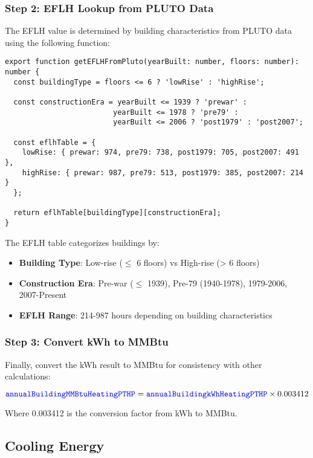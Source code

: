 \documentclass{article}
\newcommand{\code}[1]{\textcolor{blue}{\texttt{#1}}}
\begin{document}
\subsubsection{Step 2: EFLH Lookup from PLUTO Data}

The EFLH value is determined by building characteristics from PLUTO data using the following function:

\begin{lstlisting}
export function getEFLHFromPluto(yearBuilt: number, floors: number): number {
  const buildingType = floors <= 6 ? 'lowRise' : 'highRise';
  
  const constructionEra = yearBuilt <= 1939 ? 'prewar' :
                         yearBuilt <= 1978 ? 'pre79' :
                         yearBuilt <= 2006 ? 'post1979' : 'post2007';

  const eflhTable = {
    lowRise: { prewar: 974, pre79: 738, post1979: 705, post2007: 491 },
    highRise: { prewar: 987, pre79: 513, post1979: 385, post2007: 214 }
  };
  
  return eflhTable[buildingType][constructionEra];
}
\end{lstlisting}

The EFLH table categorizes buildings by:
\begin{itemize}
    \item \textbf{Building Type}: Low-rise ($\leq$ 6 floors) vs High-rise (> 6 floors)
    \item \textbf{Construction Era}: Pre-war ($\leq$ 1939), Pre-79 (1940-1978), 1979-2006, 2007-Present
    \item \textbf{EFLH Range}: 214-987 hours depending on building characteristics
\end{itemize}

\subsubsection{Step 3: Convert kWh to MMBtu}

Finally, convert the kWh result to MMBtu for consistency with other calculations:

\begin{equation}
\code{annualBuildingMMBtuHeatingPTHP} = \code{annualBuildingkWhHeatingPTHP} \times 0.003412
\end{equation}

Where 0.003412 is the conversion factor from kWh to MMBtu.

\subsection{Cooling Energy}
\end{document}
